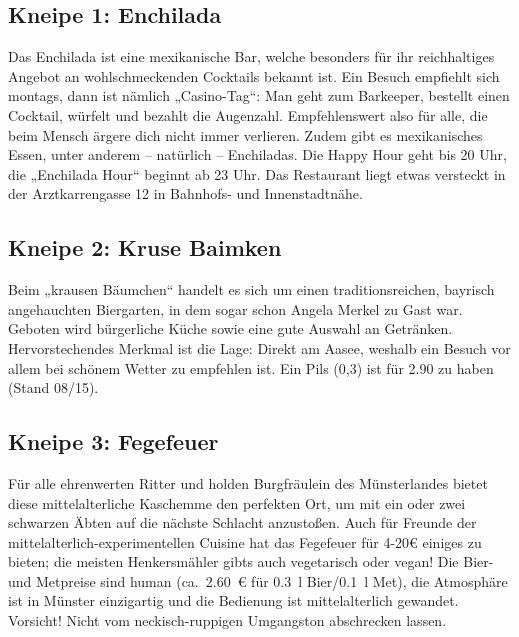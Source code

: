 \begin{multicols*}{2}
\subsection*{Kneipe 1: Enchilada}
Das Enchilada ist eine mexikanische Bar, welche besonders für ihr reichhaltiges Angebot an wohlschmeckenden Cocktails bekannt ist. Ein Besuch empfiehlt sich montags, dann ist nämlich „Casino-Tag“: Man geht zum Barkeeper, bestellt einen Cocktail, würfelt und bezahlt die Augenzahl. Empfehlenswert also für alle, die beim Mensch ärgere dich nicht immer verlieren. Zudem gibt es mexikanisches Essen, unter anderem – natürlich – Enchiladas. Die Happy Hour geht bis 20 Uhr, die „Enchilada Hour“ beginnt ab 23 Uhr.
Das Restaurant liegt etwas versteckt in der Arztkarrengasse 12 in Bahnhofs- und Innenstadtnähe.

\begin{center}
\end{center}

\subsection*{Kneipe 2: Kruse Baimken}
Beim „krausen Bäumchen“ handelt es sich um einen traditionsreichen, bayrisch angehauchten Biergarten, in dem sogar schon Angela Merkel zu Gast war. Geboten wird bürgerliche Küche sowie eine gute Auswahl an Getränken. Hervorstechendes Merkmal ist die Lage: Direkt am Aasee, weshalb ein Besuch vor allem bei schönem Wetter zu empfehlen ist. Ein Pils (0,3) ist für \num{2,90} zu haben (Stand 08/15).

\begin{center}
\end{center}

\subsection*{Kneipe 3: Fegefeuer}
Für alle ehrenwerten Ritter und holden Burgfräulein des Münsterlandes bietet diese mittelalterliche Kaschemme den perfekten Ort, um mit ein oder zwei schwarzen Äbten auf die nächste Schlacht anzustoßen. Auch für Freunde der mittelalterlich-experimentellen Cuisine hat das Fegefeuer für 4-20€ einiges zu bieten; die meisten Henkersmähler gibts auch vegetarisch oder vegan! Die Bier- und Metpreise sind human (ca.\ \SI{2,60}{\euro} für \SI{0,3}{\l} Bier/\SI{0,1}{\l} Met), die Atmosphäre ist in Münster einzigartig und die Bedienung ist mittelalterlich gewandet. Vorsicht! Nicht vom neckisch-ruppigen Umgangston abschrecken lassen.


\end{multicols*}
